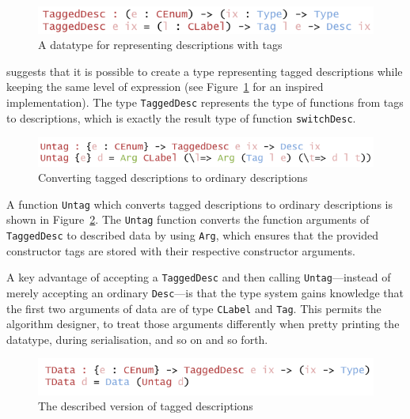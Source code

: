 \documentclass{ituthesis}
\newcommand{\ttconstructor}[1]{\textcolor{constructor-color}{\texttt{#1}}}
\newcommand{\tttype}[1]{\textcolor{type-color}{\texttt{#1}}}
\newcommand{\ttdec}[1]{\textcolor{declared-var-color}{\texttt{#1}}}
\theoremstyle{break}
\begin{document}
\begin{figure}[ht]
\begin{center}
    \includegraphics[scale=0.5]{Figures/TaggingDescriptions.png}
\end{center}
\caption{A datatype for representing descriptions with tags}
\label{fig:tagdesc}
\end{figure}

\textcite{Dagand2013acosmology} suggests that it is possible to create a type representing tagged descriptions while keeping
the same level of expression (see Figure~\ref{fig:tagdesc} for an inspired implementation).
The type \ttdec{TaggedDesc} represents the type of functions from tags to descriptions, which is exactly the result type of function \ttdec{switchDesc}.

\begin{figure}[ht]
\begin{center}
    \includegraphics[scale=0.5]{Figures/DetaggingDescriptions.png}
\end{center}
\caption{Converting tagged descriptions to ordinary descriptions}
\label{fig:untagdesc}
\end{figure}

A function \ttdec{Untag} which converts tagged descriptions to ordinary descriptions is shown in Figure~\ref{fig:untagdesc}.
The \ttdec{Untag} function converts the function arguments of \tttype{TaggedDesc} to described data by using \ttconstructor{Arg}, which ensures
that the provided constructor tags are stored with their respective constructor arguments.

A key advantage of accepting a \ttdec{TaggedDesc} and then calling \ttdec{Untag}---instead of merely accepting an ordinary \tttype{Desc}---is that the type system
gains knowledge that the first two arguments of data are of type \ttdec{CLabel} and \tttype{Tag}.
This permits the algorithm designer, to treat those arguments differently when pretty printing the datatype, during serialisation, and so on and so forth.

\begin{figure}[ht]
\begin{center}
    \includegraphics[scale=0.5]{Figures/TaggedDescriptionData.png}
\end{center}
\caption{The described version of tagged descriptions}
\label{fig:tagdata}
\end{figure}
\end{document}
